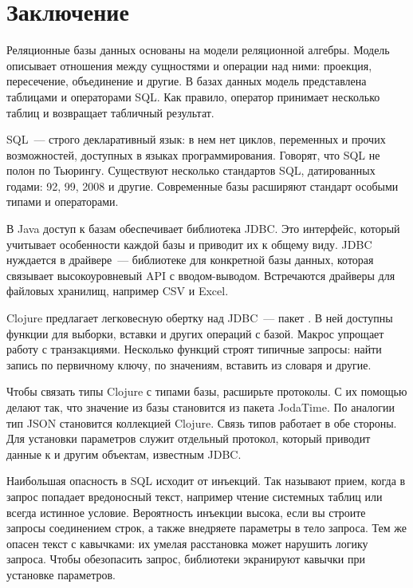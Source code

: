 \section{Заключение}

Реляционные базы данных основаны на модели реляционной алгебры. Модель описывает отношения между сущностями и операции над ними: проекция, пересечение, объединение и другие. В базах данных модель представлена таблицами и операторами SQL. Как правило, оператор принимает несколько таблиц и возвращает табличный результат.

SQL~--- строго декларативный язык: в нем нет циклов, переменных и прочих возможностей, доступных в языках программирования. Говорят, что SQL не полон по Тьюрингу. Существуют несколько стандартов SQL, датированных годами: 92, 99, 2008 и другие. Современные базы расширяют стандарт особыми типами и операторами.

В Java доступ к базам обеспечивает библиотека JDBC. Это интерфейс, который учитывает особенности каждой базы и приводит их к общему виду. JDBC нуждается в драйвере~--- библиотеке для конкретной базы данных, которая связывает высокоуровневый API с вводом-выводом. Встречаются драйверы для файловых хранилищ, например CSV и Excel.

Clojure предлагает легковесную обертку над JDBC~--- пакет . В ней доступны функции для выборки, вставки и других операций с базой. Макрос  упрощает работу с транзакциями. Несколько функций строят типичные запросы: найти запись по первичному ключу, по значениям, вставить из словаря и другие.

Чтобы связать типы Clojure с типами базы, расширьте протоколы. С их помощью делают так, что значение  из базы становится  из пакета JodaTime. По аналогии тип JSON становится коллекцией Clojure. Связь типов работает в обе стороны. Для установки параметров служит отдельный протокол, который приводит данные к  и другим объектам, известным JDBC.

Наибольшая опасность в SQL исходит от инъекций. Так называют прием, когда в запрос попадает вредоносный текст, например чтение системных таблиц или всегда истинное условие. Вероятность инъекции высока, если вы строите запросы соединением строк, а также внедряете параметры в тело запроса. Тем же опасен текст с кавычками: их умелая расстановка может нарушить логику запроса. Чтобы обезопасить запрос, библиотеки экранируют кавычки при установке параметров.

